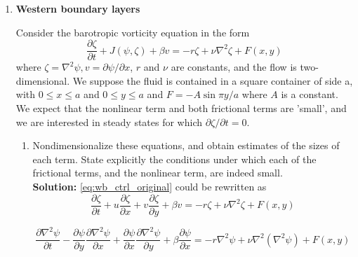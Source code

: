 \documentclass[a4paper]{article}
\begin{document}
\begin{enumerate}[label=\textbf{\arabic*.}]
\begin{enumerate}[label=\textbf{(\alph*)}]
	
	\end{enumerate}


\item \textbf{Western boundary layers}

	Consider the barotropic vorticity equation in the form
	\begin{equation}\label{eq:wb_ctrl_original}
		\frac { \partial \zeta } { \partial t } + J ( \psi ,\zeta ) + \beta v = - r \zeta + \nu \nabla ^ { 2} \zeta + F ( x ,y )
	\end{equation}
	where $\zeta = \nabla ^ { 2} \psi ,v = \partial \psi / \partial x$, $r$ and $\nu$ are constants, and the flow is two-dimensional. We suppose the fluid is contained in a square container of side a, with $0\leq x \leq a$ and $0\leq y \leq a$ and $F = - A \sin \pi y / a$ where $A$ is a constant. We expect that the nonlinear term and both frictional terms are 'small', and we are interested in steady states for which $\partial \zeta / \partial t = 0$.
	
	\begin{enumerate}[label=\textbf{(\alph*)}]
		\setcounter{enumii}{0}
		\item Nondimensionalize these equations, and obtain estimates of the sizes of each term. State explicitly the conditions under which each of the frictional terms, and the nonlinear term, are indeed small.\\
		
		\textbf{Solution:}
		\eqref{eq:wb_ctrl_original} could be rewritten as
		\begin{equation}\label{eq:wb_ctrl_org}
			\frac { \partial \zeta } { \partial t } + u\frac{\partial \zeta}{\partial x} +  v\frac{\partial \zeta}{\partial y} + \beta v = -r\zeta + \nu \nabla ^ { 2} \zeta + F ( x ,y )
		\end{equation}
		
		\begin{equation}\label{eq:wb_ctrl_org1}
		\frac { \partial \nabla^{2}\psi} { \partial t } -\frac{\partial \psi}{\partial y}\frac{\partial  \nabla^{2}\psi}{\partial x} +  \frac{\partial \psi}{\partial x}\frac{\partial  \nabla^{2}\psi}{\partial y} + \beta \frac{\partial \psi}{\partial x} = -r\nabla^{2}\psi+ \nu \nabla^2\left(\nabla^{2}\psi\right) + F ( x ,y )
		\end{equation}
		

\end{enumerate}
\end{enumerate}
\end{document}
